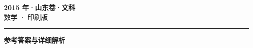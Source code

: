 \documentclass[zihao=5, a4paper]{ctexart}
\begin{document}
\begin{center}
  {\Large\bfseries 2015 年·山东卷·文科}\\[4pt]
  {\large 数学 · 印刷版}
\end{center}
\medskip
{}

\par\bigskip\hrule\bigskip
{}
\begin{center}{\large\bfseries 参考答案与详细解析}\end{center}
\smallskip

\end{document}
